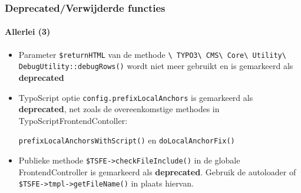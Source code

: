 \begin{frame}[fragile]
	\frametitle{Deprecated/Verwijderde functies}
	\framesubtitle{Allerlei (3)}

	\begin{itemize}

		\item Parameter \texttt{\$returnHTML} van de methode
			\small
				\texttt{\textbackslash
					TYPO3\textbackslash
					CMS\textbackslash
					Core\textbackslash
					Utility\textbackslash
					DebugUtility::debugRows()}
			\normalsize
			wordt niet meer gebruikt en is gemarkeerd als \textbf{deprecated}

		\item TypoScript optie
			\small\texttt{config.prefixLocalAnchors}\normalsize\space
			is gemarkeerd als \textbf{deprecated}, net zoals de overeenkomstige
			methodes in TypoScriptFrontendContoller:

			\small\texttt{prefixLocalAnchorsWithScript()}\normalsize\space
			en
			\small\texttt{doLocalAnchorFix()}\normalsize

		\item Publieke methode
			\small\texttt{\$TSFE->checkFileInclude()}\normalsize\space
			in de globale FrontendController is gemarkeerd als \textbf{deprecated}.
			Gebruik de autoloader of \texttt{\$TSFE->tmpl->getFileName()}
			in plaats hiervan.

	\end{itemize}

\end{frame}


